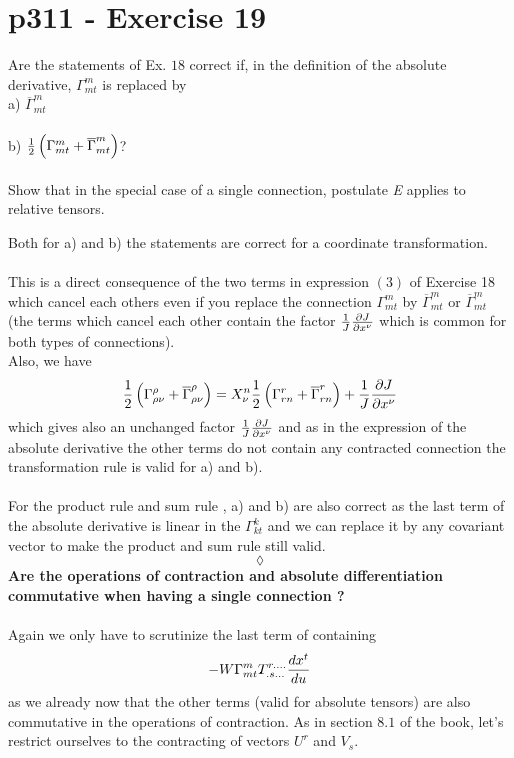 \section{p311 - Exercise 19}
\begin{tcolorbox}
Are the statements of Ex. $18$ correct if, in the definition of the absolute derivative, $\Gamma^m_{mt}$ is replaced by \\
a) $\overline{\Gamma}^m_{mt}$\\\\
b) $\frac{1}{2}\left(\Gamma^m_{mt}+ \overline{\Gamma}^m_{mt}\right)$?\\\\
Show that in the special case  of a single connection, postulate \textit{E} applies to relative tensors.
\end{tcolorbox}
Both for a) and b) the statements are correct for a coordinate transformation. \\\\
This is a direct consequence of the two terms in expression $(3)$ of Exercise 18 which cancel each others even if you replace the connection $\Gamma^m_{mt}$ by $\overline{\Gamma}^m_{mt}$ or $\overline{\Gamma}^m_{mt}$ (the terms which cancel each other contain the factor $\frac{1}{J}\pdv{J}{x^{\nu}}$ which is common for both types of connections). \\
Also, we have
$$\frac{1}{2}\left(\Gamma^{\rho}_{\rho\nu}+\overline{\Gamma}^{\rho}_{\rho\nu}\right)= X^{n}_{\nu}\frac{1}{2}\left(\Gamma^r_{rn}+\overline{\Gamma}^r_{rn}\right) + \frac{1}{J}\pdv{J}{x^{\nu}}$$ 
which gives also an unchanged factor $\frac{1}{J}\pdv{J}{x^{\nu}}$  and as in the expression of the absolute derivative the other terms do not contain any contracted connection the transformation rule is valid for a) and b).\\\\
For the product rule and sum rule , a) and b) are  also correct as the last term of the absolute derivative is linear in the $\Gamma^k_{kt}$ and we can replace it by any covariant vector to make the product and sum rule still valid.
$$\lozenge$$
\textbf{Are the operations of contraction and absolute differentiation commutative when having a single connection ?}\\\\
Again we only have to scrutinize the last term of containing 
$$-W\Gamma^m_{mt}T^{r . \dots}_{.s\dots}\dv{x^t}{u}$$ as we already now that the other terms (valid for absolute tensors) are also commutative in the operations of contraction.
As in section $8.1$ of the book, let's restrict ourselves to the contracting of vectors $U^r$ and $V_s$. 
